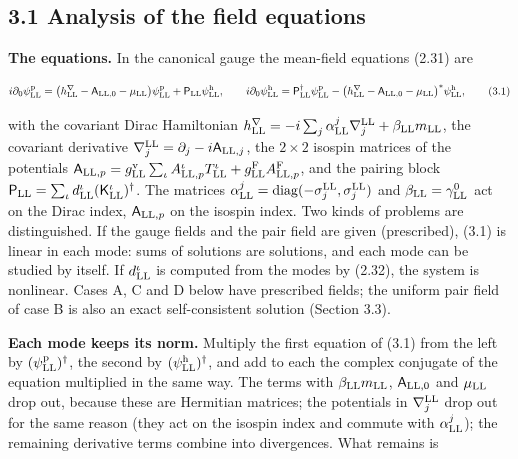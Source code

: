 \documentclass[
  10pt,
]{article}
\begin{document}
\hypertarget{analysis-of-the-field-equations}{%
\subsection{3.1 Analysis of the field
equations}\label{analysis-of-the-field-equations}}

\textbf{The equations.} In the canonical gauge the mean-field equations
(2.31) are

\[i\partial_0\psi^{\rm p}_{\rm LL}=\big(h^\nabla_{\rm LL}-\mathsf A_{{\rm LL},0}-\mu_{\rm LL}\big)\psi^{\rm p}_{\rm LL}+\mathsf P_{\rm LL}\psi^{\rm h}_{\rm LL},\qquad i\partial_0\psi^{\rm h}_{\rm LL}=\mathsf P^\dagger_{\rm LL}\psi^{\rm p}_{\rm LL}-\big(h^\nabla_{\rm LL}-\mathsf A_{{\rm LL},0}-\mu_{\rm LL}\big)^*\psi^{\rm h}_{\rm LL},\tag{3.1}\]

with the covariant Dirac Hamiltonian
\(h^\nabla_{\rm LL}=-i\sum_j\alpha^j_{\rm LL}\nabla^{\rm LL}_j+\beta_{\rm LL}m_{\rm LL}\),
the covariant derivative
\(\nabla^{\rm LL}_j=\partial_j-i\mathsf A_{{\rm LL},j}\), the
\(2\times2\) isospin matrices of the potentials
\(\mathsf A_{{\rm LL},p}=g^{\rm v}_{\rm LL}\sum_\iota A^\iota_{{\rm LL},p}T^\iota_{\rm LL}+g^{\rm F}_{\rm LL}A^{\rm F}_{{\rm LL},p}\),
and the pairing block
\(\mathsf P_{\rm LL}=\sum_\iota d^\iota_{\rm LL}(\mathsf K^\iota_{\rm LL})^\dagger\).
The matrices
\(\alpha^j_{\rm LL}=\mathrm{diag}(-\sigma^{\rm LL}_j,\sigma^{\rm LL}_j)\)
and \(\beta_{\rm LL}=\gamma^0_{\rm LL}\) act on the Dirac index,
\(\mathsf A_{{\rm LL},p}\) on the isospin index. Two kinds of problems
are distinguished. If the gauge fields and the pair field are given
(prescribed), (3.1) is linear in each mode: sums of solutions are
solutions, and each mode can be studied by itself. If
\(d^\iota_{\rm LL}\) is computed from the modes by (2.32), the system is
nonlinear. Cases A, C and D below have prescribed fields; the uniform
pair field of case B is also an exact self-consistent solution (Section
3.3).

\textbf{Each mode keeps its norm.} Multiply the first equation of (3.1)
from the left by \((\psi^{\rm p}_{\rm LL})^\dagger\), the second by
\((\psi^{\rm h}_{\rm LL})^\dagger\), and add to each the complex
conjugate of the equation multiplied in the same way. The terms with
\(\beta_{\rm LL}m_{\rm LL}\), \(\mathsf A_{{\rm LL},0}\) and
\(\mu_{\rm LL}\) drop out, because these are Hermitian matrices; the
potentials in \(\nabla^{\rm LL}_j\) drop out for the same reason (they
act on the isospin index and commute with \(\alpha^j_{\rm LL}\)); the
remaining derivative terms combine into divergences. What remains is
\end{document}
